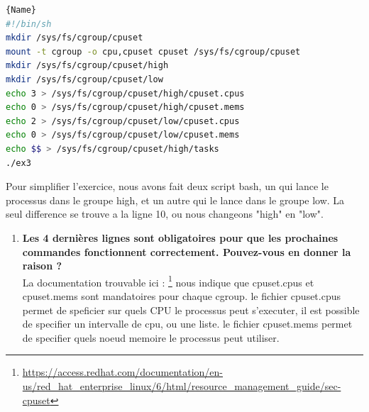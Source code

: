 \documentclass[
	a4paper, %
	10pt, %
]{CSUniSchoolLabReport}
\begin{document}
\begin{lstlisting}[language=bash, firstnumber=1]{Name}
#!/bin/sh
mkdir /sys/fs/cgroup/cpuset
mount -t cgroup -o cpu,cpuset cpuset /sys/fs/cgroup/cpuset
mkdir /sys/fs/cgroup/cpuset/high
mkdir /sys/fs/cgroup/cpuset/low
echo 3 > /sys/fs/cgroup/cpuset/high/cpuset.cpus
echo 0 > /sys/fs/cgroup/cpuset/high/cpuset.mems
echo 2 > /sys/fs/cgroup/cpuset/low/cpuset.cpus
echo 0 > /sys/fs/cgroup/cpuset/low/cpuset.mems
echo $$ > /sys/fs/cgroup/cpuset/high/tasks
./ex3
\end{lstlisting}
Pour simplifier l'exercice, nous avons fait deux script bash, un qui lance le processus dans le groupe high, et un autre qui le lance dans le groupe low.
La seul difference se trouve a la ligne 10, ou nous changeons "high" en "low".


\begin{enumerate}[label=\textbf{\arabic*}]
	\item \textbf{Les 4 dernières lignes sont obligatoires pour que les prochaines commandes fonctionnent correctement. Pouvez-vous en donner la raison ?}\\
	La documentation trouvable ici : \footnote{\href{https://access.redhat.com/documentation/en-us/red_hat_enterprise_linux/6/html/resource_management_guide/sec-cpuset}{https://access.redhat.com/documentation/en-us/red\_hat\_enterprise\_linux/6/html/resource\_management\_guide/sec-cpuset}}
	nous indique que cpuset.cpus et cpuset.mems sont mandatoires pour chaque cgroup.
	le fichier cpuset.cpus permet de speficier sur quels CPU le processus peut s'executer, il est possible de specifier un intervalle de cpu, ou une liste.
	le fichier cpuset.mems permet de specifier quels noeud memoire le processus peut utiliser.
	

\end{enumerate}
\end{document}
